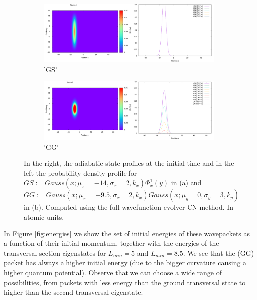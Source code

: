 \documentclass[11pt, a4paper]{article} %
\begin{document}
\begin{figure}[h!]
  \centering
  \begin{subfigure}[b]{0.7\linewidth}
    \includegraphics[width=\linewidth]{GS_inik.png}
    \caption{'GS'}
  \end{subfigure}
  \begin{subfigure}[b]{0.7\linewidth}
    \includegraphics[width=\linewidth]{GG_inik.png}
    \caption{'GG'}
  \end{subfigure}

  \caption{ In the right, the adiabatic state profiles at the initial time and in the left the probability density profile for $GS:=Gauss(x;\mu_x=-14, \sigma_x=2, k_x)\Phi^1_x(y)$ in (a) and  $GG:=Gauss(x;\mu_x=-9.5, \sigma_x=2, k_x)Gauss(x;\mu_y=0, \sigma_y=3, k_y)$ in (b). Computed using the full wavefunction evolver CN method. In atomic units.}\vspace{-0.3cm}
  \label{fig:population}
\end{figure}

In Figure \ref{fig:energies} we show the set of initial energies of these wavepackets as a function of their initial momentum, together with the energies of the transversal section eigenstates for $L_{min}=5$ and $L_{min}=8.5$. We see that the (GG) packet has always a higher initial energy (due to the bigger curvature causing a higher quantum potential). Observe that  we can choose a wide range of possibilities, from packets with less energy than the ground transversal state to higher than the second transversal eigenstate. \vspace{-0.3cm}
\end{document}
